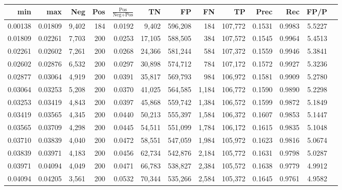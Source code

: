 \begin{tabular}{rrrrrrrrrrrrr}
\toprule
    min &     max &   Neg & Pos & $\frac{\text{Pos}}{\text{Neg}+\text{Pos}}$ &      TN &      FP &      FN &      TP &   Prec &    Rec &   FP/P \\
\midrule
0.00138 & 0.01809 & 9,402 & 184 &                                     0.0192 &   9,402 & 596,208 &     184 & 107,772 & 0.1531 & 0.9983 & 5.5227 \\
0.01809 & 0.02261 & 7,703 & 200 &                                     0.0253 &  17,105 & 588,505 &     384 & 107,572 & 0.1545 & 0.9964 & 5.4513 \\
0.02261 & 0.02602 & 7,261 & 200 &                                     0.0268 &  24,366 & 581,244 &     584 & 107,372 & 0.1559 & 0.9946 & 5.3841 \\
0.02602 & 0.02876 & 6,532 & 200 &                                     0.0297 &  30,898 & 574,712 &     784 & 107,172 & 0.1572 & 0.9927 & 5.3236 \\
0.02877 & 0.03064 & 4,919 & 200 &                                     0.0391 &  35,817 & 569,793 &     984 & 106,972 & 0.1581 & 0.9909 & 5.2780 \\
0.03064 & 0.03253 & 5,208 & 200 &                                     0.0370 &  41,025 & 564,585 &   1,184 & 106,772 & 0.1590 & 0.9890 & 5.2298 \\
0.03253 & 0.03419 & 4,843 & 200 &                                     0.0397 &  45,868 & 559,742 &   1,384 & 106,572 & 0.1599 & 0.9872 & 5.1849 \\
0.03419 & 0.03565 & 4,345 & 200 &                                     0.0440 &  50,213 & 555,397 &   1,584 & 106,372 & 0.1607 & 0.9853 & 5.1447 \\
0.03565 & 0.03709 & 4,298 & 200 &                                     0.0445 &  54,511 & 551,099 &   1,784 & 106,172 & 0.1615 & 0.9835 & 5.1048 \\
0.03710 & 0.03839 & 4,040 & 200 &                                     0.0472 &  58,551 & 547,059 &   1,984 & 105,972 & 0.1623 & 0.9816 & 5.0674 \\
0.03839 & 0.03971 & 4,183 & 200 &                                     0.0456 &  62,734 & 542,876 &   2,184 & 105,772 & 0.1631 & 0.9798 & 5.0287 \\
0.03971 & 0.04094 & 4,049 & 200 &                                     0.0471 &  66,783 & 538,827 &   2,384 & 105,572 & 0.1638 & 0.9779 & 4.9912 \\
0.04094 & 0.04205 & 3,561 & 200 &                                     0.0532 &  70,344 & 535,266 &   2,584 & 105,372 & 0.1645 & 0.9761 & 4.9582 \\

\end{tabular}
